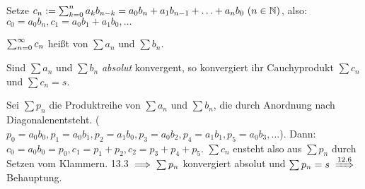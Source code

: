 \documentclass[a4paper,twoside,DIV15,BCOR12mm]{scrbook}
\begin{document}
\begin{definition}[Cauchyprodukt]
Setze $c_n := \sum_{k=0}^{n}{a_k b_{n-k}} = a_0b_n+a_1b_{n-1}+\ldots+a_nb_0\ (n\in\mathbb{N})$, also: $c_0 = a_0b_n, c_1 = a_0b_1+a_1b_0, \ldots$

$\sum_{n=0}^{\infty}{c_n}$ heißt  von $\sum{a_n}$ und $\sum{b_n}$.
\end{definition}


%
%
%

\begin{satz}
Sind $\sum{a_n}$ und $\sum{b_n}$ \emph{absolut} konvergent, so konvergiert ihr Cauchyprodukt $\sum{c_n}$ und $\sum{c_n} = s$.
\end{satz}

\begin{beweis}
Sei $\sum{p_n}$ die Produktreihe von $\sum{a_n}$ und $\sum{b_n}$, die durch \glqq Anordnung nach Diagonalen\grqq entsteht. ($p_0 = a_0b_0, p_1=a_0b_1, p_2 = a_1b_0, p_3 = a_0b_2, p_4 = a_1b_1, p_5=a_0b_3, \ldots$). Dann: $c_0  =a_0b_0 = p_0, c_1=p_1+p_2, c_2 = p_3+p_4+p_5$. $\sum{c_n}$ ensteht also aus $\sum{p_n}$ durch Setzen vom Klammern. 13.3 $\implies \sum{p_n}$ konvergiert absolut und $\sum{p_n} = s \folgtnach{12.6}$ Behauptung.
\end{beweis}
\end{document}
